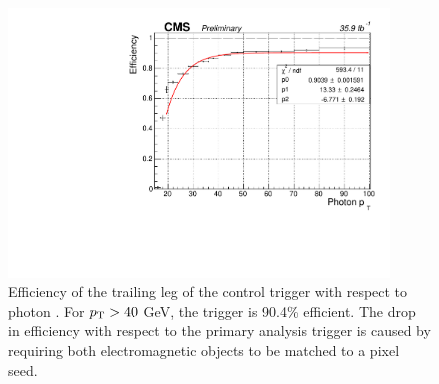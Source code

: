 \begin{figure}[h]
\begin{center}
\includegraphics[width=0.9\textwidth]{Figures/Trigger/controlTrailingEff.pdf}
\end{center}
\caption{Efficiency of the trailing leg of the control trigger with respect to photon \pT. 
For $p_{\mathrm{T}} > 40$ GeV, the trigger is 90.4\% efficient. The drop in efficiency with respect to the primary analysis 
trigger is caused by requiring both electromagnetic objects to be matched to a pixel seed.}
\label{fig:controlTrailEff}
\end{figure}

